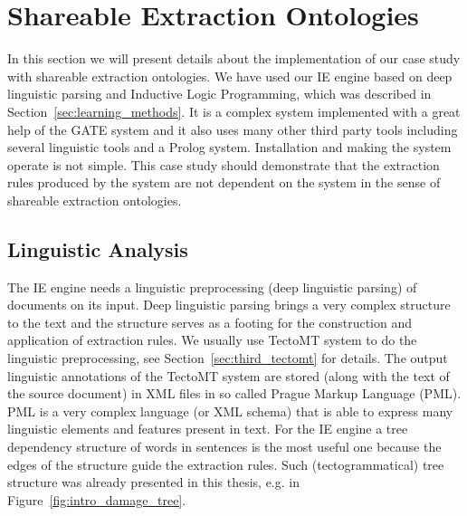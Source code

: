 \clearpage


\section{Shareable Extraction Ontologies} \label{sec:onto_implement}
\graphicspath{{../img/ch70/}}


In this section we will present details about the implementation of our case study with shareable extraction ontologies.  We have used our IE engine based on deep linguistic parsing and Inductive Logic Programming, which was described in Section~\ref{sec:learning_methods}. It is a complex system implemented with a great help of the GATE system and it also uses many other third party tools including several linguistic tools and a Prolog system. Installation and making the system operate is not simple. This case study should demonstrate that the extraction rules produced by the system are not dependent on the system in the sense of shareable extraction ontologies.




\subsection{Linguistic Analysis}



The IE engine needs a linguistic preprocessing (deep linguistic parsing) of documents on its input. Deep linguistic parsing brings a very complex structure to the text and the structure serves as a footing for the construction and application of extraction rules. We usually use TectoMT system to do the linguistic preprocessing, see Section~\ref{sec:third_tectomt} for details. The output linguistic annotations of the TectoMT system are stored (along with the text of the source document) in XML files in so called Prague Markup Language (PML). PML is a very complex language (or XML schema) that is able to express many linguistic elements and features present in text. For the IE engine a tree dependency structure of words in sentences is the most useful one because the edges of the structure guide the extraction rules. Such (tectogrammatical) tree structure was already presented in this thesis, e.g. in Figure~\ref{fig:intro_damage_tree}.



